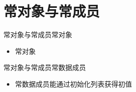 
\section[常对象与常成员]{常对象与常成员}\label{sec:chap03-sec06}
\begin{frame}[t, fragile]{常对象与常成员}{常对象}%
  \begin{itemize}
  \item 常对象
  \end{itemize}
  \begin{center}
    \hspace{1em}
    \begin{minipage}{0.45\linewidth}
    \end{minipage}\quad
    \begin{minipage}{0.35\linewidth}
    \end{minipage}    
  \end{center}
\end{frame}

\begin{frame}[t, fragile]{常对象与常成员}{常数据成员}%
  \begin{itemize}
  \item 常数据成员\alert{能通过初始化列表获得初值}
  \end{itemize}
  \begin{center}
    \begin{minipage}{0.8\linewidth}
    \end{minipage}
  \end{center}
\end{frame}

